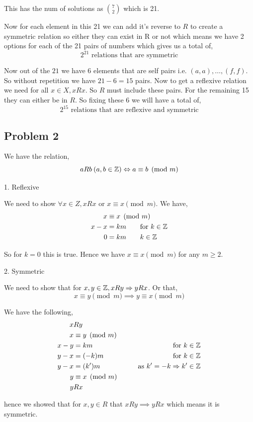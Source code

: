 \documentclass[a4paper]{report}
\begin{document}
This has the num of solutions as $7 \choose 2$ which is 21.

Now for each element in this 21 we can add it's reverse to  $R$ to create a symmetric relation so either they can exist in R or not which means we have 2 options for each of the 21 pairs of numbers which gives us a total of, 
$$ 2^{21}  \text{ relations that are symmetric}$$ 

Now out of the $21$ we have $6$ elements that are self pairs i.e. $(a,a),\dots,(f,f)$. So without repetition we have $21 - 6 = 15$ pairs. Now to get a reflexive relation we need for all $x \in X, xRx$. So  $R$ must include these pairs. For the remaining 15 they can either be in $R$. So fixing  these 6  we will have a total of, 
$$ 2^{15} \text{ relations that are reflexive and symmetric}$$ 
\subsection*{Problem 2}
We have the relation, 
$$ aRb \: (a,b \in \mathbb{Z}) \Leftrightarrow  a \equiv b \pmod{m}$$ 

1. Reflexive

We need to show $\forall x \in Z, xRx$  or $x \equiv x \pmod{m}$. We have, 
\begin{align*}
    x &\equiv x \pmod{m}\\
    x - x &= km \qquad \text{for $k \in \mathbb{Z}$}\\
    0 &= km \qquad \text{$k \in \mathbb{Z}$}
\end{align*}

So for $k = 0$ this is true. Hence we have $x \equiv x \pmod{m}$ for any  $m \ge 2$.

2. Symmetric

We need to show that  for $x,y \in \mathbb{Z},  xRy \Rightarrow yRx$. Or that,  
$$ x \equiv y \pmod m \implies y \equiv x \pmod m $$ 

We have the following, 
\begin{align*}
    x&Ry\\
    x &\equiv y \pmod m\\
    x - y &= km \qquad &\text{for $k \in \mathbb{Z}$}\\
    y - x &= (-k)m \qquad &\text{for $k \in \mathbb{Z}$}\\
    y - x &= (k')m \qquad &\text{as $k' = -k \Rightarrow k' \in \mathbb{Z}$}\\
    y &\equiv x  \pmod m \qquad \\
    y&Rx
\end{align*}

hence we showed that for $x,y \in R$  that $xRy \implies yRx$ which means it is symmetric.
\end{document}
